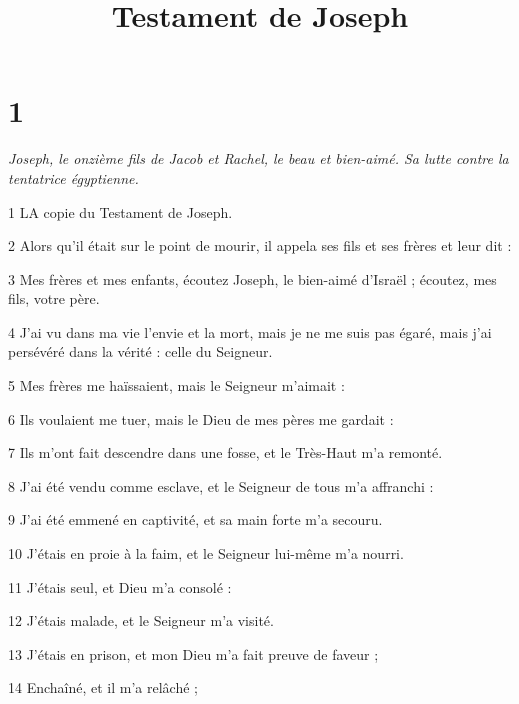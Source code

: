 

\title{Testament de Joseph}

\chapter{1}

\par \textit{Joseph, le onzième fils de Jacob et Rachel, le beau et bien-aimé. Sa lutte contre la tentatrice égyptienne.}

\par 1 LA copie du Testament de Joseph.

\par 2 Alors qu'il était sur le point de mourir, il appela ses fils et ses frères et leur dit :

\par 3 Mes frères et mes enfants, écoutez Joseph, le bien-aimé d'Israël ; écoutez, mes fils, votre père.

\par 4 J'ai vu dans ma vie l'envie et la mort, mais je ne me suis pas égaré, mais j'ai persévéré dans la vérité : celle du Seigneur.

\par 5 Mes frères me haïssaient, mais le Seigneur m'aimait :

\par 6 Ils voulaient me tuer, mais le Dieu de mes pères me gardait :

\par 7 Ils m'ont fait descendre dans une fosse, et le Très-Haut m'a remonté.

\par 8 J'ai été vendu comme esclave, et le Seigneur de tous m'a affranchi :

\par 9 J'ai été emmené en captivité, et sa main forte m'a secouru.

\par 10 J'étais en proie à la faim, et le Seigneur lui-même m'a nourri.

\par 11 J'étais seul, et Dieu m'a consolé :

\par 12 J'étais malade, et le Seigneur m'a visité.

\par 13 J'étais en prison, et mon Dieu m'a fait preuve de faveur ;

\par 14 Enchaîné, et il m'a relâché ;

